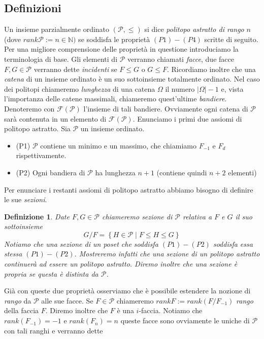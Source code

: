 \documentclass[12pt,a4paper,twoside]{book}
\newcommand{\p}{\mathcal{P}}
\newtheorem{defin}{Definizione}
\begin{document}
\subsection{Definizioni}
Un insieme parzialmente ordinato $(\p,\leq)$ si dice \emph{politopo astratto di rango} $n$ (dove $rank\p:=n\in\mathbb{N})$ se soddisfa le propriet\`a $(P1)-(P4)$ scritte 
di seguito. Per una migliore comprensione delle propriet\`a in questione introduciamo la terminologia di base. Gli elementi di $\p$ verranno chiamati \emph{facce},
due facce $F,G\in\p$ verranno dette \emph{incidenti} se $F\leq G$ o $G\leq F$. Ricordiamo inoltre che una \emph{catena} di un insieme ordinato \`e un suo 
sottoinsieme totalmente ordinato. Nel caso dei politopi chiameremo \emph{lunghezza} di una catena $\Omega$ il numero $\left|\Omega\right|-1$ e, vista
l'importanza delle catene massimali, chiameremo quest'ultime \emph{bandiere}.
Denoteremo con $\mathcal{F}(\p)$ l'insieme di tali bandiere. Ovviamente ogni catena di $\p$ sar\`a contenuta in un elemento di $\mathcal{F}(\p)$.
Enunciamo i primi due assiomi di politopo astratto. Sia $\p$ un insieme ordinato.
\begin{itemize}
\item (P1) $\p$ contiene un minimo e un massimo, che chiamiamo $F_{-1}$ e $F_d$ rispettivamente.
\item (P2) Ogni bandiera di $\p$ ha lunghezza $n+1$ (contiene quindi $n+2$ elementi)
\end{itemize}
Per enunciare i restanti assiomi di politopo astratto abbiamo bisogno di definire le sue \emph{sezioni}.
\begin{defin}
Date $F,G\in\p$ chiameremo sezione di $\p$ relativa a $F$ e $G$ il suo sottoinsieme
\begin{equation*}
G/F=\left\{H\in\p\mid F\leq H\leq G\right\}
\end{equation*}
Notiamo che una sezione di un poset che soddisfa $(P1)-(P2)$ soddisfa essa stessa $(P1)-(P2)$. Mostreremo infatti che una sezione di un politopo astratto
continuer\`a ad essere un politopo astratto. Diremo inoltre che una sezione \`e propria se questa \`e distinta da $\p$.
\end{defin}
\par
Gi\`a con queste due propriet\`a osserviamo che \`e possibile estendere la nozione di \emph{rango} da $\p$ alle sue facce.
Se $F\in\p$ chiameremo $rankF:=rank(F/F_{-1})$ \emph{rango} della faccia $F$. Diremo inoltre che $F$ \`e una $i$-faccia.
Notiamo che $rank(F_{-1})=-1$ e $rank(F_n)=n$ queste facce sono ovviamente le uniche di $\p$ con tali ranghi e verranno dette
\end{document}
